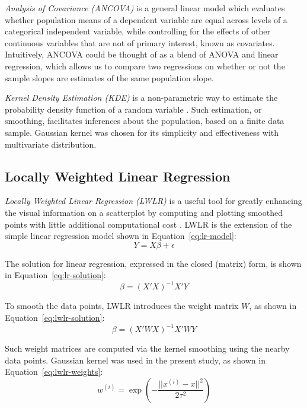 	\textit{Analysis of Covariance (ANCOVA)} is a general linear model which evaluates whether population means of a dependent variable are equal across levels of a categorical independent variable, while controlling for the effects of other continuous variables that are not of primary interest, known as covariates.  Intuitively, ANCOVA could be thought of as a blend of ANOVA and linear regression, which allows us to compare two regressions on whether or not the sample slopes are estimates of the same population slope. 

	
	\textit{Kernel Density Estimation (KDE)} is a non-parametric way to estimate the probability density function of a random variable . Such estimation, or smoothing, facilitates inferences about the population, based on a finite data sample. Gaussian kernel was chosen for its simplicity and effectiveness with multivariate distribution. 
	
	\subsection{Locally Weighted Linear Regression \label{lwlr}}
	\textit{Locally Weighted Linear Regression (LWLR)} is a useful tool for greatly enhancing the visual information on a scatterplot by computing and plotting smoothed points with little additional computational cost . LWLR is the extension of the simple linear regression model shown in Equation~\ref{eq:lr-model}:
	\begin{equation}
	Y=X\beta+\epsilon
	\label{eq:lr-model}
	\end{equation}
	
	The solution for linear regression, expressed in the closed (matrix) form, is shown in Equation~\ref{eq:lr-solution}:
	\begin{equation}
	\beta =(X'X)^{-1}X'Y
	\label{eq:lr-solution}
	\end{equation}
	
	To smooth the data points, LWLR introduces the weight matrix $W$, as shown in Equation~\ref{eq:lwlr-solution}:
	\begin{equation}
	\beta =(X'WX)^{-1} X'WY
	\label{eq:lwlr-solution}
	\end{equation}
	
	Such weight matrices are computed via the kernel smoothing using the nearby data points. Gaussian kernel was used in the present study, as shown in Equation~\ref{eq:lwlr-weights}:
	\begin{equation}
	w^{(i)}=\exp(-\frac{||x^{(i)} - x||^2}{2\tau^2})
	\label{eq:lwlr-weights}
	\end{equation}
	
